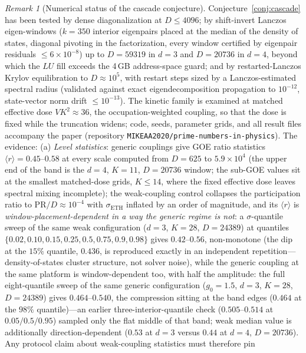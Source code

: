 \documentclass[11pt,a4paper]{article}
\theoremstyle{plain}
\theoremstyle{definition}
\theoremstyle{remark}
\newtheorem{remark}[theorem]{Remark}
\begin{document}
\begin{remark}[Numerical status of the cascade conjecture]\label{rem:numerics}
Conjecture~\ref{conj:cascade} has been tested by dense diagonalization at $D\leq4096$; by
shift-invert Lanczos eigen-windows ($k=350$ interior eigenpairs placed at the median of the
density of states, diagonal pivoting in the factorization, every window certified by
eigenpair residuals $\leq6\times10^{-8}$) up to $D=59319$ in $d=3$ and $D=20736$ in $d=4$,
beyond which the $LU$ fill exceeds the 4\,GB address-space guard; and by
restarted-Lanczos Krylov equilibration to $D\approx10^{5}$, with restart steps sized by a
Lanczos-estimated spectral radius (validated against exact eigendecomposition propagation
to $10^{-12}$, state-vector norm drift $\leq10^{-13}$). The kinetic family is examined at
matched effective dose $VK^{2}\approx36$, the occupation-weighted coupling, so that the dose
is fixed while the truncation widens; code, seeds, parameter grids, and all result files
accompany the paper (repository \texttt{MIKEAA2020/prime-numbers-in-physics}). The evidence:
(a) \emph{Level statistics}: generic couplings give GOE ratio statistics
$\langle r\rangle=0.45$--$0.58$ at every scale computed from $D=625$ to
$5.9\times10^{4}$ (the upper end of the band is the $d=4$, $K=11$, $D=20736$ window; the
sub-GOE values sit at the smallest matched-dose grids, $K\leq14$, where the fixed effective
dose leaves spectral mixing incomplete); the weak-coupling control collapses the
participation ratio to
$\mathrm{PR}/D\approx10^{-4}$ with $\sigma_{\mathrm{ETH}}$ inflated by an order of
magnitude, and its $\langle r\rangle$ is \emph{window-placement-dependent in a way the
generic regime is not}: a $\sigma$-quantile sweep of the same weak configuration
($d=3$, $K=28$, $D=24389$) at quantiles $\{0.02,0.10,0.15,0.25,0.5,0.75,0.9,0.98\}$
gives $0.42$--$0.56$, non-monotone (the dip at the $15\%$ quantile, $0.436$, is reproduced
exactly in an independent repetition---density-of-states cluster structure, not solver
noise),
while the generic coupling at the same platform is window-dependent too, with half the
amplitude: the full eight-quantile sweep of the same generic configuration
($g_{0}=1.5$, $d=3$, $K=28$, $D=24389$) gives $0.464$--$0.540$, the compression sitting at
the band edges ($0.464$ at the $98\%$ quantile)---an earlier three-interior-quantile check
($0.505$--$0.514$ at $0.05/0.5/0.95$) sampled only the flat middle of that band;
weak median value is additionally direction-dependent ($0.53$ at $d=3$ versus $0.44$ at
$d=4$, $D=20736$). Any protocol claim about weak-coupling statistics must therefore pin

\end{remark}
\end{document}
